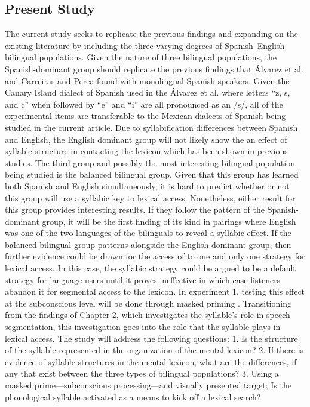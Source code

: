 \subsection{Present Study}
The current study seeks to replicate the previous findings and expanding on the existing literature by including the three varying degrees of Spanish–English bilingual populations. Given the nature of three bilingual populations, the Spanish-dominant group should replicate the previous findings that Álvarez et al. \parencite*{Alvarez2004-nd} and Carreiras and Perea \parencite*{Carreiras2002-mp} found with monolingual Spanish speakers. Given the Canary Island dialect of Spanish used in the Álvarez et al. \parencite*{Alvarez2004-nd} where letters “z, s, and c” when followed by “e” and “i” are all pronounced as an /s/, all of the experimental items are transferable to the Mexican dialects of Spanish being studied in the current article. Due to syllabification differences between Spanish and English, the English dominant group will not likely show the an effect of syllable structure in contacting the lexicon which has been shown in previous studies. The third group and possibly the most interesting bilingual population being studied is the balanced bilingual group. Given that this group has learned both Spanish and English simultaneously, it is hard to predict whether or not this group will use a syllabic key to lexical access. Nonetheless, either result for this group provides interesting results. If they follow the pattern of the Spanish-dominant group, it will be the first finding of its kind in pairings where English was one of the two languages of the bilinguals to reveal a syllabic effect. If the balanced bilingual group patterns alongside the English-dominant group, then further evidence could be drawn for the access of to one and only one strategy for lexical access. In this case, the syllabic strategy could be argued to be a default strategy for language users until it proves ineffective in which case listeners abandon it for segmental access to the lexicon. In experiment 1, testing this effect at the subconscious level will be done through masked priming \citep{Forster1984-sf}. 
Transitioning from the findings of Chapter 2, which investigates the syllable’s role in speech segmentation, this investigation goes into the role that the syllable plays in lexical access. The study will address the following questions:
1.	Is the structure of the syllable represented in the organization of the mental lexicon?
2.	If there is evidence of syllable structures in the mental lexicon, what are the differences, if any that exist between the three types of bilingual populations?
3.	Using a masked prime—subconscious processing—and visually presented target; Is the phonological syllable activated as a means to kick off a lexical search?


